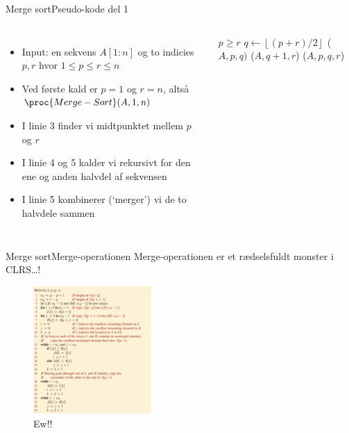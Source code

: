 \documentclass[aspectratio=1610]{beamer}
\newcommand{\floor}[1]{\left\lfloor #1 \right\rfloor}
\begin{document}
\begin{frame}{Merge sort}{Pseudo-kode del 1}
    \begin{columns}

        \begin{itemize}[<+->]
            \small
            \item Input: en sekvens $A[1:n]$ og to \alert{indicies} $p, r$ hvor
                $1 \leq p \leq r \leq n$
            \item Ved første kald er $p=1$ og $r=n$, altså
                $\proc{Merge-Sort}(A,1,n)$
            \item I linie 3 finder vi midtpunktet mellem $p$ og $r$
            \item I linie 4 og 5 kalder vi rekursivt for den ene og anden
                halvdel af sekvensen
            \item I linie 5 kombinerer (`merger') vi de to halvdele sammen
        \end{itemize}


        \begin{minipage}{\textwidth}
            \centering
            \begin{tcolorbox}

                \vspace{-\abovedisplayskip}
                \begin{codebox}
                    \li \If $p \geq r$ \Then
                        \li \Return
                    \End
                    \li $q \gets \floor{(p+r)/2}$
                    \li {}($A,p,q)$
                    \li {}($A,q+1,r$)
                    \li {}($A,p,q,r$)
                \end{codebox}
            \end{tcolorbox}
        \end{minipage}
        
    \end{columns}
\end{frame}

\begin{frame}{Merge sort}{Merge-operationen}
    Merge-operationen er et rædselsfuldt monster i CLRS\ldots!

    \begin{figure}[h]
        \centering
        \includegraphics[width=0.4\textwidth]{merge-clrs}
        \caption{Ew!!}
        \label{fig:merge-clrs}
    \end{figure}
\end{frame}
\end{document}
